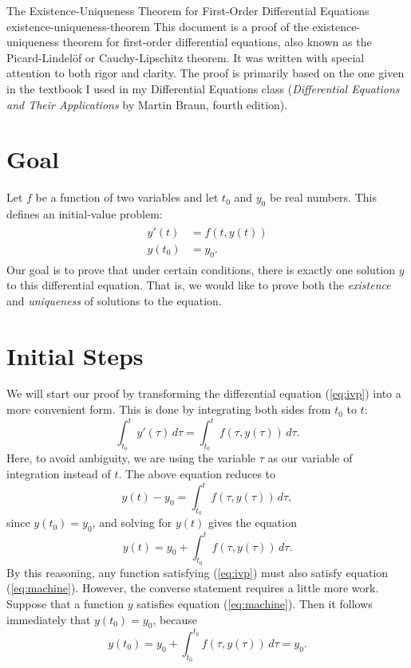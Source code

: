 \documentclass{myart}
\newcommand{\eq}[1]{(\ref{eq:#1})}
\begin{document}
\titlepage
{The Existence-Uniqueness Theorem for First-Order Differential
  Equations}
{existence-uniqueness-theorem}
{This document is a proof of the existence-uniqueness theorem for
  first-order differential equations, also known as the
  Picard-Lindel\"of or Cauchy-Lipschitz theorem. It was written with
  special attention to both rigor and clarity. The proof is primarily
  based on the one given in the textbook I used in my Differential
  Equations class (\textit{Differential Equations and Their
    Applications} by Martin Braun, fourth edition).}

\section{Goal}

Let $f$ be a function of two variables and let $t_0$ and $y_0$ be real
numbers. This defines an initial-value problem:
\begin{align} \label{eq:ivp}
\begin{split}
y'(t) &= f(t, y(t)) \\
y(t_0) &= y_0.
\end{split}
\end{align}
Our goal is to prove that under certain conditions, there is exactly
one solution $y$ to this differential equation. That is, we would like
to prove both the \emph{existence} and \emph{uniqueness} of solutions
to the equation.

\section{Initial Steps}

We will start our proof by transforming the differential equation
\eq{ivp} into a more convenient form. This is done by integrating both
sides from $t_0$ to $t$:
\begin{equation*}
\int_{t_0}^t y'(\tau) \,d\tau = \int_{t_0}^t f(\tau, y(\tau)) \,d\tau.
\end{equation*}
Here, to avoid ambiguity, we are using the variable $\tau$ as our
variable of integration instead of $t$. The above equation reduces to
\begin{equation*}
y(t) - y_0 = \int_{t_0}^t f(\tau, y(\tau)) \,d\tau,
\end{equation*}
since $y(t_0) = y_0$, and solving for $y(t)$ gives the equation
\begin{equation} \label{eq:machine}
y(t) = y_0 + \int_{t_0}^t f(\tau, y(\tau)) \,d\tau.
\end{equation}
By this reasoning, any function satisfying \eq{ivp} must also satisfy
equation \eq{machine}. However, the converse statement requires a
little more work. Suppose that a function $y$ satisfies equation
\eq{machine}. Then it follows immediately that $y(t_0) = y_0$, because
\begin{equation*}
y(t_0) = y_0 + \int_{t_0}^{t_0} f(\tau, y(\tau)) \,d\tau = y_0.
\end{equation*}
\end{document}
